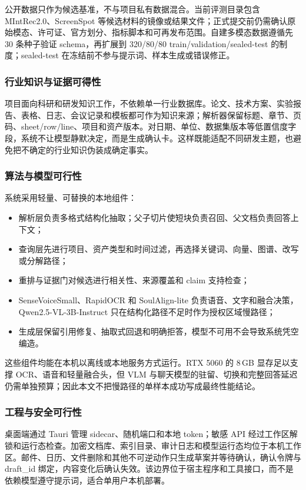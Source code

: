 \documentclass[UTF8,12pt]{ctexart}
\begin{document}
公开数据只作为候选基准，不与项目私有数据混合。当前评测目录包含 MIntRec2.0、ScreenSpot 等候选材料的镜像或结果文件；正式提交前仍需确认原始模态、许可证、官方划分、指标脚本和可再发布范围。自建多模态数据遵循先 30 条种子验证 schema，再扩展到 320/80/80 train/validation/sealed-test 的制度；sealed-test 在冻结前不参与提示词、样本生成或错误修正。

\subsubsection{行业知识与证据可得性}
项目面向科研和研发知识工作，不依赖单一行业数据库。论文、技术方案、实验报告、表格、日志、会议记录和模板都可作为知识来源；解析器保留标题、章节、页码、sheet/row/line、项目和资产版本。对日期、单位、数据集版本等低置信度字段，系统不让模型静默决定，而是生成确认卡。这样既能适配不同研发主题，也避免把不确定的行业知识伪装成确定事实。

\subsubsection{算法与模型可行性}
系统采用轻量、可替换的本地组件：
\begin{itemize}
  \item 解析层负责多格式结构化抽取；父子切片使短块负责召回、父文档负责回答上下文；
  \item 查询层先进行项目、资产类型和时间过滤，再选择关键词、向量、图谱、改写或分解路径；
  \item 重排与证据门对候选进行相关性、来源覆盖和 claim 支持检查；
  \item SenseVoiceSmall、RapidOCR 和 SoulAlign-lite 负责语音、文字和融合决策，Qwen2.5-VL-3B-Instruct 只在结构化路径不足时作为授权区域慢路径；
  \item 生成层保留引用修复、抽取式回退和明确拒答，模型不可用不会导致系统凭空编造。
\end{itemize}
这些组件均能在本机以离线或本地服务方式运行。RTX 5060 的 8\,GB 显存足以支撑 OCR、语音和轻量融合头，但 VLM 与聊天模型的驻留、切换和完整回答延迟仍需单独预算；因此本文不把慢路径的单样本成功写成最终性能结论。

\subsubsection{工程与安全可行性}
桌面端通过 Tauri 管理 sidecar、随机端口和本地 token；敏感 API 经过工作区解锁和运行态检查。加密文档库、索引目录、审计日志和模型运行态均位于本机工作区。邮件、日历、文件删除和其他不可逆动作只生成草案并等待确认，确认令牌与 draft\_id 绑定，内容变化后确认失效。该边界位于宿主程序和工具接口，而不是依赖模型遵守提示词，适合单用户本机部署。
\end{document}

